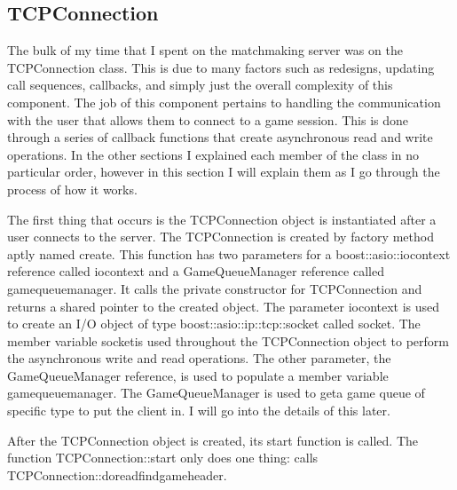 \documentclass[conference]{IEEEtran}
\begin{document}
\subsection{TCPConnection}
The bulk of my time that I spent on the matchmaking server was on the TCPConnection class.
This is due to many factors such as redesigns, updating call sequences, callbacks, and simply just the overall complexity of this component.
The job of this component pertains  to handling the communication with the user that allows them to connect to a game session.
This is done through a series of callback functions that create asynchronous read and write operations.
In the other sections I explained each member of the class in no particular order, however in this section I will explain them as I go through the process of how it works.

The first thing that occurs is the TCPConnection object is instantiated after a user connects to the server.
The TCPConnection is created by factory method aptly named create.
This function has two parameters for a boost::asio::io\textunderscore context reference called io\textunderscore context and a GameQueueManager reference called game\textunderscore queue\textunderscore manager.
It calls the private constructor for TCPConnection and returns a shared pointer to the created object.
The parameter  io\textunderscore context is used to create an I/O object of type boost::asio::ip::tcp::socket called socket\textunderscore .
The member variable socket\textunderscore is used throughout the TCPConnection object to perform the asynchronous write and read operations.
The other parameter, the GameQueueManager reference, is used to populate a member variable game\textunderscore queue\textunderscore manager\textunderscore .
The GameQueueManager is used to geta game queue of specific type to put the client in.
I will go into the details of this later.

After the TCPConnection object is created, its start function is called.
The function TCPConnection::start only does one thing: calls TCPConnection::do\textunderscore read\textunderscore find\textunderscore game\textunderscore header.
\end{document}
